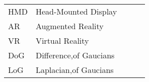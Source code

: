 \begin{table}[h]
\begin{tabular}{|l|l|lll}
\cline{1-2}
HMD & Head-Mounted Display   &  &  &  \\ \cline{1-2}
AR  & Augmented Reality      &  &  &  \\ \cline{1-2}
VR  & Virtual Reality      &  &  &  \\ \cline{1-2}
DoG & Difference,of Gaucians &  &  &  \\ \cline{1-2}
LoG & Laplacian,of Gaucians  &  &  &  \\ \cline{1-2}
\end{tabular}
\end{table}